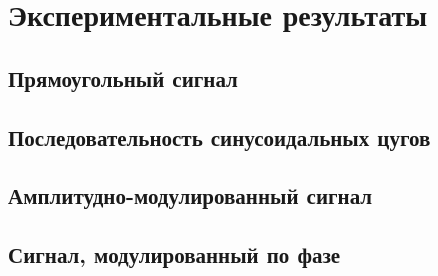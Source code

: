 \section*{Экспериментальные результаты}

\subsection*{Прямоугольный сигнал}

\subsection*{Последовательность синусоидальных цугов}

\subsection*{Амплитудно-модулированный сигнал}

\subsection*{Сигнал, модулированный по фазе}
